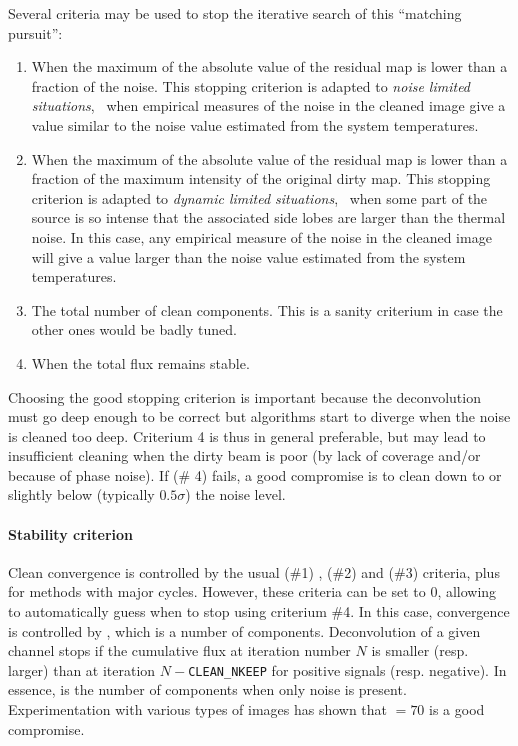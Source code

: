 Several criteria may be used to stop the iterative search of this
``matching pursuit'':
\begin{enumerate}
\item When the maximum of the absolute value of the residual map is lower
  than a fraction of the noise. This stopping criterion is adapted to
  \emph{noise limited situations}, \ie\ when empirical measures of the
  noise in the cleaned image give a value similar to the noise value
  estimated from the system temperatures.
\item When the maximum of the absolute value of the residual map is lower
  than a fraction of the maximum intensity of the original dirty map.  This
  stopping criterion is adapted to \emph{dynamic limited situations}, \ie\ 
  when some part of the source is so intense that the associated side lobes
  are larger than the thermal noise. In this case, any empirical measure of
  the noise in the cleaned image will give a value larger than the noise
  value estimated from the system temperatures.
\item The total number of clean components. This is a sanity criterium in
  case the other ones would be badly tuned.
\item When the total flux remains stable.
\end{enumerate}
Choosing the good stopping criterion is important because the deconvolution
must go deep enough to be correct but \clean{} algorithms start to diverge
when the noise is cleaned too deep. Criterium 4 is thus in general
preferable, but may lead to insufficient cleaning when the dirty beam
is poor (by lack of \uv{} coverage and/or because of phase noise). 
If (\# 4) fails, a good compromise is to clean down to or
slightly below (typically $0.5\sigma$) the noise level.

\paragraph{Stability criterion}

Clean convergence is controlled by the usual  (\#1) ,  (\#2) 
and \sicvar{NITER} (\#3) criteria,
plus  for methods with major cycles. However, these criteria
can be set to 0, allowing \imager{} to automatically guess when to stop
using criterium \#4.
In this case, convergence is controlled by , which is 
a number of components. Deconvolution of a given channel stops if
the cumulative flux at iteration number $N$ is smaller (resp. larger) than at iteration
$N-$\texttt{CLEAN\_NKEEP} for positive signals (resp. negative). In essence, 
is the number of components when only noise is present. Experimentation
with various types of images has shown that \sicvar{CLEAN\_KEEP}$ = 70$ is
a good compromise. 

